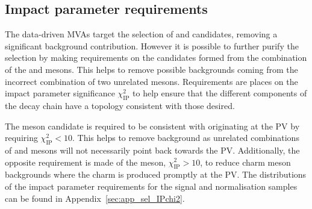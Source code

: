 

\subsection{Impact parameter requirements}
\label{sec:selection_IPCHI2}
The data-driven MVAs target the selection of \phiz and \Dsp candidates, removing a significant background contribution. However it is possible to further purify the selection by making requirements on the \Bp candidates formed from the combination of the \Dsp and \phiz mesons. This helps to remove possible backgrounds coming from the incorrect combination of two unrelated mesons. Requirements are places on the impact parameter significance $\chi^{2}_{\text{IP}}$ to help ensure that the different components of the decay chain have a topology consistent with those desired.

The \Bp meson candidate is required to be consistent with originating at the PV by requiring $\chi^2_{\text{IP}} < 10$. This helps to remove background as unrelated combinations of \Dsp and \phiz mesons will not necessarily point back towards the PV.
Additionally, the opposite requirement is made of the \Dsp meson, $\chi^2_{\text{IP}} > 10$, to reduce charm meson backgrounds where the charm is produced promptly at the PV.
The distributions of the impact parameter requirements for the signal and normalisation samples can be found in Appendix~\ref{sec:app_sel_IPchi2}.



